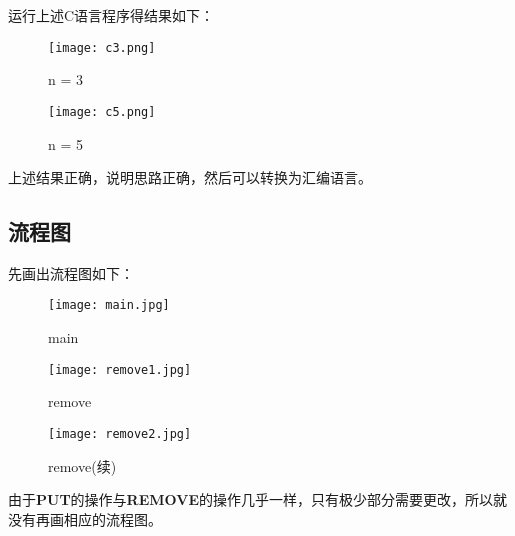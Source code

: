 \documentclass{article}
\begin{document}
运行上述C语言程序得结果如下：
\graphicspath{{figs/}}
\begin{figure*}[htbp]
	\centering
	\begin{minipage}{0.6\linewidth}
		\centering
		\texttt{[image: c3.png]}
		\caption{n = 3}
	\end{minipage}
	\qquad%
	\begin{minipage}{0.6\linewidth}
		\centering
		\texttt{[image: c5.png]}
		\caption{n = 5}
	\end{minipage}
\end{figure*}

上述结果正确，说明思路正确，然后可以转换为汇编语言。

\subsection{流程图}

先画出流程图如下：

\begin{figure*}[htbp]
	\centering
	\begin{minipage}{0.6\linewidth}
		\centering
		\texttt{[image: main.jpg]}
		\caption{main}
	\end{minipage}
\end{figure*}
\begin{figure}[htbp]
	\centering
	\begin{minipage}{0.49\linewidth}
		\centering
		\texttt{[image: remove1.jpg]}
		\caption{remove}
	\end{minipage}
	\begin{minipage}{0.49\linewidth}
		\centering
		\texttt{[image: remove2.jpg]}
		\caption{remove(续)}
	\end{minipage}
\end{figure}

由于{\bfseries PUT}的操作与{\bfseries REMOVE}的操作几乎一样，只有极少部分需要更改，所以就没有再画相应的流程图。
\end{document}
